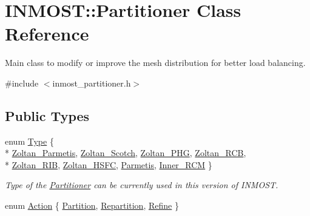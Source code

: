 \hypertarget{classINMOST_1_1Partitioner}{\section{I\-N\-M\-O\-S\-T\-:\-:Partitioner Class Reference}
\label{classINMOST_1_1Partitioner}
}


Main class to modify or improve the mesh distribution for better load balancing.  




{\ttfamily \#include $<$inmost\-\_\-partitioner.\-h$>$}

\subsection*{Public Types}
\begin{DoxyCompactItemize}
\item 
enum \hyperlink{classINMOST_1_1Partitioner_a0699b96f7945e283398750d585eca311}{Type} \{ \\*
\hyperlink{classINMOST_1_1Partitioner_a0699b96f7945e283398750d585eca311ad68b743147cac9faa8500a57e7f22bb0}{Zoltan\-\_\-\-Parmetis}, 
\hyperlink{classINMOST_1_1Partitioner_a0699b96f7945e283398750d585eca311accde25f216216d856af62a7f0540ee3a}{Zoltan\-\_\-\-Scotch}, 
\hyperlink{classINMOST_1_1Partitioner_a0699b96f7945e283398750d585eca311a8d727bd538073eb973d5daf67c6e807b}{Zoltan\-\_\-\-P\-H\-G}, 
\hyperlink{classINMOST_1_1Partitioner_a0699b96f7945e283398750d585eca311a39286e4771ba65760112a1332b584b7d}{Zoltan\-\_\-\-R\-C\-B}, 
\\*
\hyperlink{classINMOST_1_1Partitioner_a0699b96f7945e283398750d585eca311aa113ffce71bea31673400f4ed6f3f68c}{Zoltan\-\_\-\-R\-I\-B}, 
\hyperlink{classINMOST_1_1Partitioner_a0699b96f7945e283398750d585eca311a01cc8e6db082dc0bcdc19a8d5d0ea2e2}{Zoltan\-\_\-\-H\-S\-F\-C}, 
\hyperlink{classINMOST_1_1Partitioner_a0699b96f7945e283398750d585eca311a32d02a7da6210f8213944fb9c351a778}{Parmetis}, 
\hyperlink{classINMOST_1_1Partitioner_a0699b96f7945e283398750d585eca311a4411b1b230aac80bb4ce95d0000ff336}{Inner\-\_\-\-R\-C\-M}
 \}
\begin{DoxyCompactList}\small\item\em Type of the \hyperlink{classINMOST_1_1Partitioner}{Partitioner} can be currently used in this version of I\-N\-M\-O\-S\-T. \end{DoxyCompactList}\item 
enum \hyperlink{classINMOST_1_1Partitioner_a0a4053a79855f16dbb53c13b39bc75c3}{Action} \{ \hyperlink{classINMOST_1_1Partitioner_a0a4053a79855f16dbb53c13b39bc75c3ad747444c0947b3a6a697efd54ae42771}{Partition}, 
\hyperlink{classINMOST_1_1Partitioner_a0a4053a79855f16dbb53c13b39bc75c3ae667d6f0560495262c0010866080eff8}{Repartition}, 
\hyperlink{classINMOST_1_1Partitioner_a0a4053a79855f16dbb53c13b39bc75c3a2d75221ee80b15356021e80283da41d6}{Refine}
 \}
\end{DoxyCompactItemize}
